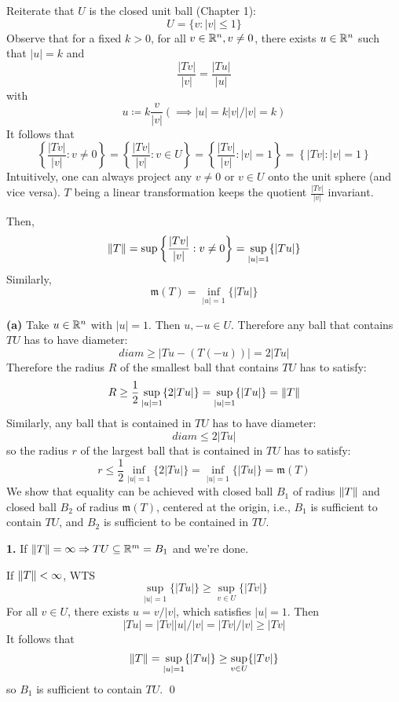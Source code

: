 \documentclass[a4paper, 12pt]{article}
\begin{document}
\begin{solution}
    Reiterate that $U$ is the closed unit ball (Chapter 1):
    \[
        U = \{v : |v| \leq 1\}
    \]
    Observe that for a fixed $k > 0$, for all $v \in \mathbb{R}^n, v \neq 0$, there exists $u \in \mathbb{R}^n$ such that $|u| = k$ and \[
        \frac{|Tv|}{|v|} = \frac{|Tu|}{|u|}
    \]
    with \[
        u \coloneqq k\frac{v}{|v|} (\implies |u| = k|v|/|v| = k)
    \]
    It follows that \[
        \left\{\frac{|Tv|}{|v|} : v \neq 0\right\} = \left\{\frac{|Tv|}{|v|} : v \in U\right\}= \left\{\frac{|Tv|}{|v|} : |v| = 1\right\} = \left\{|Tv| : |v| = 1\right\}
    \]
    Intuitively, one can always project any $v \neq 0$ or $v \in U$ onto the unit sphere (and vice versa). $T$ being a linear transformation keeps the quotient $\frac{|Tv|}{|v|}$ invariant.

    Then, \[
        \lVert T\rVert = \sup \left\{\frac{|Tv|}{|v|} : v \neq 0 \right\} = \sup_{|u| = 1}\{|Tu|\}
    \]
    Similarly,
    \[
        \mathfrak{m}(T) = \inf_{|u| = 1}\{|Tu|\}
    \]


    \textbf{(a)}
    Take $u \in \mathbb{R}^n$ with $|u| = 1$. Then $u, -u \in U$. Therefore any ball that contains $TU$ has to have diameter:
    \[
        diam \geq |Tu - (T(-u))| = 2|Tu|
    \]
    Therefore the radius $R$ of the smallest ball that contains $TU$ has to satisfy:
    \[
        R \geq \frac{1}{2}\sup_{|u| = 1}\{2 |Tu|\} = \sup_{|u| = 1}\{|Tu|\} = \lVert T\rVert
    \]
    Similarly, any ball that is contained in $TU$ has to have diameter: \[
        diam \leq 2|Tu|
    \]
    so the radius $r$ of the largest ball that is contained in $TU$ has to satisfy: \[
        r \leq \frac{1}{2}\inf_{|u| = 1}\{2 |Tu|\} = \inf_{|u| = 1}\{|Tu|\} = \mathfrak{m}(T)
    \]
    We show that equality can be achieved with closed ball $B_1$ of radius $\lVert T\rVert$ and closed ball $B_2$ of radius $\mathfrak{m}(T)$, centered at the origin, i.e., $B_1$ is sufficient to contain $TU$, and $B_2$ is sufficient to be contained in $TU$.

    \textbf{1.} If $\lVert T\rVert = \infty \Rightarrow TU \subseteq \mathbb{R}^m = B_1$ and we're done.

    If $\lVert T\rVert < \infty$, WTS \[
        \sup_{|u| = 1}\{|Tu|\} \geq \sup_{v \in U} \{|Tv|\}
    \]
    For all $v \in U$, there exists $u = v/|v|$, which satisfies $|u| = 1$. Then \[
        |Tu| = |Tv||u|/|v| = |Tv|/|v| \geq |Tv|
    \]
    It follows that  \[
        \lVert T\rVert = \sup_{|u| = 1}\{|Tu|\} \geq \sup_{v \in U} \{|Tv|\}
    \]
    so $B_1$ is sufficient to contain $TU$. \qed


\end{solution}
\end{document}
